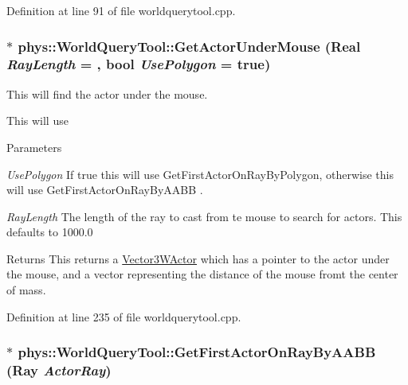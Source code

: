 Definition at line 91 of file worldquerytool.cpp.

\hypertarget{classphys_1_1WorldQueryTool_a8efba55076bad228d7cda0b82895f32a}{
\subsubsection[{GetActorUnderMouse}]{ $\ast$ phys::WorldQueryTool::GetActorUnderMouse ({\bf Real} {\em RayLength} = {}, \/  bool {\em UsePolygon} = {\ttfamily true})}}
\label{d8/d69/classphys_1_1WorldQueryTool_a8efba55076bad228d7cda0b82895f32a}


This will find the actor under the mouse. 

This will use 
\begin{DoxyParams}{Parameters}
\item[{\em UsePolygon}]If true this will use GetFirstActorOnRayByPolygon, otherwise this will use GetFirstActorOnRayByAABB . \item[{\em RayLength}]The length of the ray to cast from te mouse to search for actors. This defaults to 1000.0 \end{DoxyParams}
\begin{DoxyReturn}{Returns}
This returns a \hyperlink{classphys_1_1Vector3WActor}{Vector3WActor} which has a pointer to the actor under the mouse, and a vector representing the distance of the mouse fromt the center of mass. 
\end{DoxyReturn}


Definition at line 235 of file worldquerytool.cpp.

\hypertarget{classphys_1_1WorldQueryTool_a67575416c2e9c652bbd873649ee38baf}{
\subsubsection[{GetFirstActorOnRayByAABB}]{ $\ast$ phys::WorldQueryTool::GetFirstActorOnRayByAABB ({\bf Ray} {\em ActorRay})}}
\label{d8/d69/classphys_1_1WorldQueryTool_a67575416c2e9c652bbd873649ee38baf}


